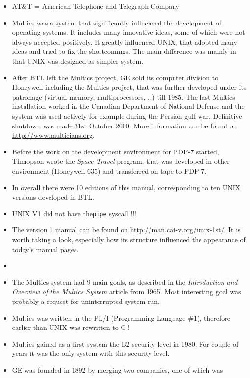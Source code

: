 \begin{itemize}
\item AT\&T = American Telephone and Telegraph Company
\item Multics was a system that significantly influenced the development of
operating systems. It includes many innovative ideas, some of which were not
always accepted positively. It greatly influenced UNIX, that adopted many ideas
and tried to fix the shortcomings. The main difference was mainly in that UNIX
was designed as simpler system.
\item After BTL left the Multics project, GE sold its computer division to
Honeywell including the Multics project, that was further developed under its
patronage (virtual memory, multiprocessors, \dots) till 1985.
The last Multics installation worked in the Canadian Department of National
Defense and the system was used actively for example during the Persion gulf
war. Definitive shutdown was made 31st October 2000. More information can be
found on \url{http://www.multicians.org}.
\item Before the work on the development environment for PDP-7 started, Thmopson
wrote the \emph{Space Travel} program, that was developed in other environment
(Honeywell 635) and transferred on tape to PDP-7.
\item In overall there were 10 editions of this manual, corresponding to ten
UNIX versions developed in BTL.
\item UNIX V1 did not have the\texttt{pipe} syscall !!!
\item The version 1 manual can be found on
\url{http://man.cat-v.org/unix-1st/}.
It is worth taking a look, especially how its structure influenced the
appearance of today's manual pages.
\item {}
\item The Multics system had 9 main goals, as described in the
\emph{Introduction and Overview of the Multics System} article from 1965.
Most interesting goal was probably a request for uninterrupted system run.
\item Multics was written in the PL/I (Programming Language \#1), therefore
earlier than UNIX was rewritten to C !
\item Multics gained as a first system the B2 security level in 1980.
For couple of years it was the only system with this security level.
\item GE was founded in 1892 by merging two companies, one of which was

\end{itemize}
